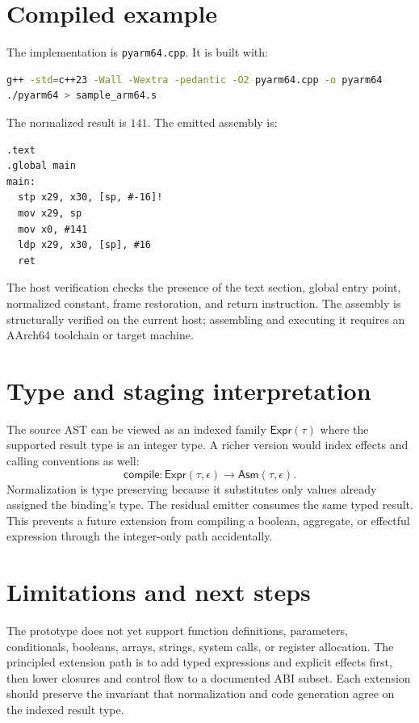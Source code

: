 \documentclass[11pt,a4paper]{article}
\begin{document}
\section{Compiled example}
The implementation is \texttt{pyarm64.cpp}. It is built with:
\begin{lstlisting}[language=bash]
g++ -std=c++23 -Wall -Wextra -pedantic -O2 pyarm64.cpp -o pyarm64
./pyarm64 > sample_arm64.s
\end{lstlisting}
The normalized result is $141$. The emitted assembly is:
\begin{lstlisting}
.text
.global main
main:
  stp x29, x30, [sp, #-16]!
  mov x29, sp
  mov x0, #141
  ldp x29, x30, [sp], #16
  ret
\end{lstlisting}
The host verification checks the presence of the text section, global entry point, normalized constant, frame restoration, and return instruction. The assembly is structurally verified on the current host; assembling and executing it requires an AArch64 toolchain or target machine.

\section{Type and staging interpretation}
The source AST can be viewed as an indexed family $\mathsf{Expr}(\tau)$ where the supported result type is an integer type. A richer version would index effects and calling conventions as well:
\[
\mathsf{compile}:\mathsf{Expr}(\tau,\epsilon)\to\mathsf{Asm}(\tau,\epsilon).
\]
Normalization is type preserving because it substitutes only values already assigned the binding's type. The residual emitter consumes the same typed result. This prevents a future extension from compiling a boolean, aggregate, or effectful expression through the integer-only path accidentally.

\section{Limitations and next steps}
The prototype does not yet support function definitions, parameters, conditionals, booleans, arrays, strings, system calls, or register allocation. The principled extension path is to add typed expressions and explicit effects first, then lower closures and control flow to a documented ABI subset. Each extension should preserve the invariant that normalization and code generation agree on the indexed result type.
\end{document}
